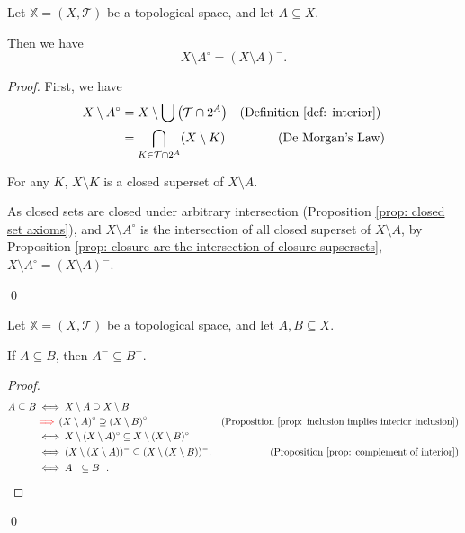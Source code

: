 \begin{proposition}
	\label{prop: complement of interior}
	Let $\mathbb X = (X, \mathcal T)$ be a topological space, and let $A \subseteq X$.
	
	Then we have
	$$
	X \setminus A^\circ = (X \setminus A)^-.
	$$
	
	\begin{proof}
		First, we have
		$$
		\begin{aligned}
			X \setminus A^\circ &= X \setminus \bigcup \left(\mathcal T \cap 2^A \right) 
				& \text{(Definition \ref{def: interior}) }\\
			&= \bigcap_{K \in \mathcal T \cap 2^A} (X \setminus K)
				& \text{(De Morgan's Law)}\\
		\end{aligned}
		$$
		
		For any $K$, $X \setminus K$ is a closed superset of $X \setminus A$.
		
		As closed sets are closed under arbitrary intersection (Proposition \ref{prop: closed set axioms}), and $X \setminus A^\circ$ is the intersection of all closed superset of $X \setminus A$, by Proposition \ref{prop: closure are the intersection of closure supsersets}, $X \setminus A^\circ = (X \setminus A)^-$.
		
		\qed
	\end{proof}
\end{proposition}


\begin{proposition}
	\label{prop: inclusion implies closure inclusion}
	Let $\mathbb X = (X, \mathcal T)$ be a topological space, and let $A, B \subseteq X$.
	
	If $A \subseteq B$, then $A^- \subseteq B^-$.
	
	\begin{proof}
		$$
		\begin{aligned}
			A \subseteq B &\iff X \setminus A \supseteq X \setminus B
				& \\
			&\textcolor{red}{\implies} \left(X \setminus A \right)^\circ \supseteq \left( X \setminus B \right)^\circ
				&\text{(Proposition \ref{prop: inclusion implies interior inclusion})} \\
			&\iff X \setminus (X \setminus A)^\circ  \subseteq X \setminus (X \setminus B)^\circ
				& \\
			&\iff (X \setminus (X \setminus A))^- \subseteq (X \setminus (X \setminus B))^-.
				& \text{(Proposition \ref{prop: complement of interior})} \\
			&\iff A^- \subseteq B^-.
		\end{aligned}
		$$
	\end{proof}
	
	\qed
\end{proposition}


